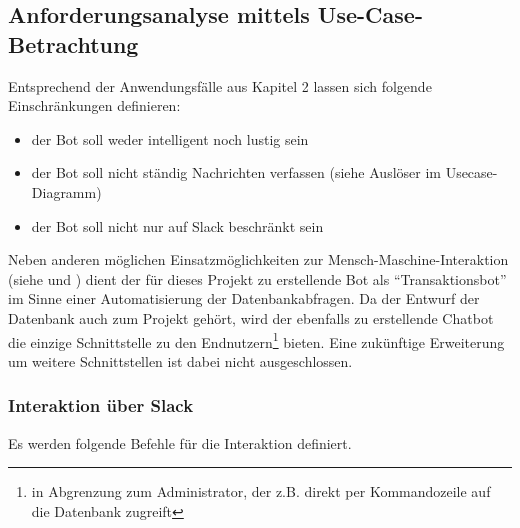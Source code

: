 \subsection{Anforderungsanalyse mittels Use-Case-Betrachtung}

Entsprechend der Anwendungsfälle aus Kapitel 2 lassen sich folgende Einschränkungen definieren:

\begin{itemize}
    \item der Bot soll weder intelligent noch lustig sein
    \item der Bot soll nicht ständig Nachrichten verfassen (siehe Auslöser im Usecase-Diagramm)
    \item der Bot soll nicht nur auf Slack beschränkt sein
\end{itemize}

Neben anderen möglichen Einsatzmöglichkeiten zur Mensch-Maschine-Interaktion (siehe \cite{PanConversationalInterfacesFuture2017} und \cite{GruensteinConversationalInterfaces2009}) dient der für dieses Projekt zu erstellende Bot als \enquote{Transaktionsbot} im Sinne einer Automatisierung der Datenbankabfragen. Da der Entwurf der Datenbank auch zum Projekt gehört, wird der ebenfalls zu erstellende Chatbot die einzige Schnittstelle zu den Endnutzern\footnote{in Abgrenzung zum Administrator, der z.B. direkt per Kommandozeile auf die Datenbank zugreift} bieten. Eine zukünftige Erweiterung um weitere Schnittstellen ist dabei nicht ausgeschlossen.

\subsubsection{Interaktion über Slack}

Es werden folgende Befehle für die Interaktion definiert.

